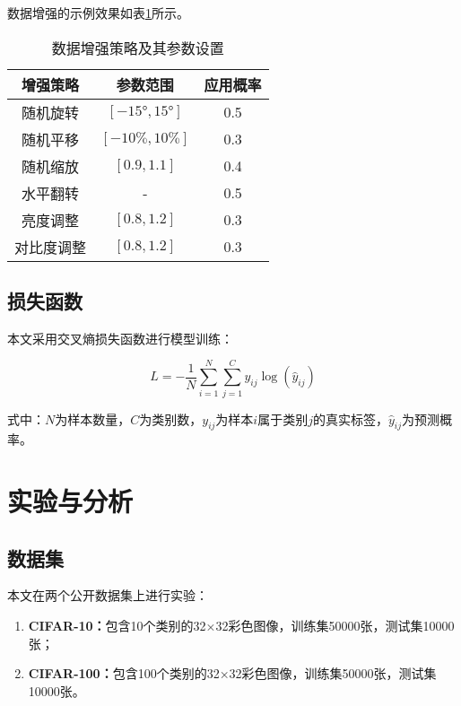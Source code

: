 \documentclass[a4paper,12pt]{article}
\begin{document}
数据增强的示例效果如表\ref{tab:augmentation}所示。

\begin{table}[htbp]
\centering
\caption{数据增强策略及其参数设置}
\label{tab:augmentation}
\begin{tabular}{ccc}
\toprule
\textbf{增强策略} & \textbf{参数范围} & \textbf{应用概率} \\
\midrule
随机旋转 & $[-15°, 15°]$ & 0.5 \\
随机平移 & $[-10\%, 10\%]$ & 0.3 \\
随机缩放 & $[0.9, 1.1]$ & 0.4 \\
水平翻转 & - & 0.5 \\
亮度调整 & $[0.8, 1.2]$ & 0.3 \\
对比度调整 & $[0.8, 1.2]$ & 0.3 \\
\bottomrule
\end{tabular}
\end{table}

\subsection{损失函数}

本文采用交叉熵损失函数进行模型训练：

\begin{equation}
L = -\frac{1}{N} \sum_{i=1}^{N} \sum_{j=1}^{C} y_{ij} \log(\hat{y}_{ij})
\label{eq:loss}
\end{equation}

式中：$N$为样本数量，$C$为类别数，$y_{ij}$为样本$i$属于类别$j$的真实标签，$\hat{y}_{ij}$为预测概率。

\section{实验与分析}

\subsection{数据集}

本文在两个公开数据集上进行实验：

\begin{enumerate}
    \item \textbf{CIFAR-10：}包含10个类别的32×32彩色图像，训练集50000张，测试集10000张；
    \item \textbf{CIFAR-100：}包含100个类别的32×32彩色图像，训练集50000张，测试集10000张。
\end{enumerate}
\end{document}
